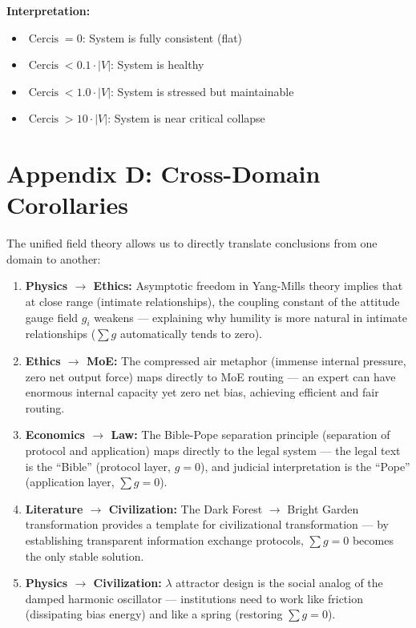 \documentclass[12pt,a4paper]{article}
\theoremstyle{plain}
\theoremstyle{definition}
\begin{document}
\textbf{Interpretation:}
\begin{itemize}
    \item $\operatorname{Cercis} = 0$: System is fully consistent (flat)
    \item $\operatorname{Cercis} < 0.1 \cdot |V|$: System is healthy
    \item $\operatorname{Cercis} < 1.0 \cdot |V|$: System is stressed but maintainable
    \item $\operatorname{Cercis} > 10 \cdot |V|$: System is near critical collapse
\end{itemize}

\section{Appendix D: Cross-Domain Corollaries}

The unified field theory allows us to directly translate conclusions from one domain to another:

\begin{enumerate}[label=\textbf{Cross-Corollary \arabic*:}]
    \item \textbf{Physics $\to$ Ethics:} Asymptotic freedom in Yang-Mills theory implies that
    at close range (intimate relationships), the coupling constant of the attitude gauge field $g_i$ weakens —
    explaining why humility is more natural in intimate relationships ($\sum g$ automatically tends to zero).

    \item \textbf{Ethics $\to$ MoE:} The compressed air metaphor (immense internal pressure, zero net output force)
    maps directly to MoE routing — an expert can have enormous internal capacity yet zero net bias,
    achieving efficient and fair routing.

    \item \textbf{Economics $\to$ Law:} The Bible-Pope separation principle (separation of protocol and application)
    maps directly to the legal system — the legal text is the ``Bible'' (protocol layer, $g=0$),
    and judicial interpretation is the ``Pope'' (application layer, $\sum g = 0$).

    \item \textbf{Literature $\to$ Civilization:} The Dark Forest $\to$ Bright Garden transformation
    provides a template for civilizational transformation — by establishing transparent information exchange protocols,
    $\sum g = 0$ becomes the only stable solution.

    \item \textbf{Physics $\to$ Civilization:} $\lambda$ attractor design is the social analog of the damped harmonic oscillator —
    institutions need to work like friction (dissipating bias energy) and like a spring
    (restoring $\sum g = 0$).
\end{enumerate}
\end{document}
